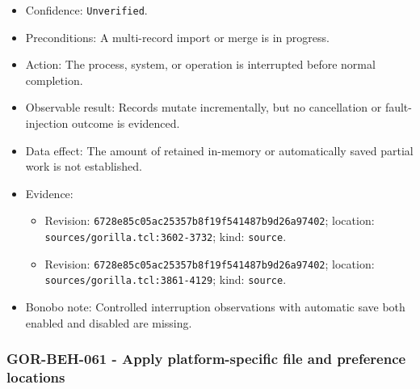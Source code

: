 \documentclass[
  letterpaper,
]{article}
\newcommand{\passthrough}[1]{#1}
\providecommand{\tightlist}{%
  \setlength{\itemsep}{0pt}\setlength{\parskip}{0pt}}
\begin{document}
\begin{itemize}
\tightlist
\item
  Confidence: \nolinkurl{Unverified}.
\item
  Preconditions: A multi-record import or merge is in progress.
\item
  Action: The process, system, or operation is interrupted before normal completion.
\item
  Observable result: Records mutate incrementally, but no cancellation or fault-injection outcome is evidenced.
\item
  Data effect: The amount of retained in-memory or automatically saved partial work is not established.
\item
  Evidence:

  \begin{itemize}
  \tightlist
  \item
    Revision: \nolinkurl{6728e85c05ac25357b8f19f541487b9d26a97402}; location: \nolinkurl{sources/gorilla.tcl:3602-3732};
    kind: \passthrough{\lstinline!source!}.
  \item
    Revision: \nolinkurl{6728e85c05ac25357b8f19f541487b9d26a97402}; location: \nolinkurl{sources/gorilla.tcl:3861-4129};
    kind: \passthrough{\lstinline!source!}.
  \end{itemize}
\item
  Bonobo note: Controlled interruption observations with automatic save both enabled and disabled are missing.
\end{itemize}

\subsubsection{GOR-BEH-061 - Apply platform-specific file and preference
locations}\label{gor-beh-061---apply-platform-specific-file-and-preference-locations}
\end{document}
